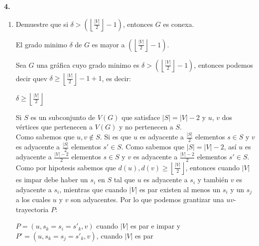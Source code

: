 \documentclass[12pt]{article}
\begin{document}
\vspace{1cm}
%
%
\textbf{4.}
\begin{enumerate}[label=\alph*)]

    \item Demuestre que si $\delta >  \left( \left\lfloor \frac{|V|}{2} \right\rfloor - 1 \right)$, entonces $G$ es conexa.
    \begin{tcolorbox}[title=\textbf{Hipotesis}, colback=red!15!white, colframe=black!]
        El grado minimo $\delta$ de $G$ es mayor a $\left( \left\lfloor \frac{|V|}{2} \right\rfloor - 1 \right)$.
    \end{tcolorbox}

        Sea $G$ una gráfica cuyo grado minimo es $\delta > \left( \left\lfloor \frac{|V|}{2} \right\rfloor - 1 \right)$, entonces
        podemos decir quev $\delta \geq  \left\lfloor \frac{|V|}{2} \right\rfloor - 1 + 1$, es decir:

        \begin{center}
        $\delta \geq  \left\lfloor \frac{|V|}{2} \right\rfloor$
        \end{center}

        Si $S$ es un subconjunto de $ V(G)$ que satisface $|S| = |V| - 2$ y $u$, $v$ dos vértices
        que pertenecen a $V(G)$ y no pertenecen a $S$.\\

        Como sabemos que $u, v \notin S$. Si es que $u$ es adyacente 
        a $\frac{|S|}{2}$ elementos $s \in S$ y $v$ es adyacente a $\frac{|S|}{2}$ elementos $s' \in S$.
        Como sabemos que $|S| = |V| - 2$, así $u$ es adyacente a $\frac{|V| - 2}{2}$ elementos $s \in S$ y $v$ es adyacente a
        $\frac{|V| - 2}{2}$ elementos $s' \in S$.\\

        Como por hipotesis sabemos que $d(u), d(v) \geq \left\lfloor \frac{|V|}{2} \right\rfloor$, entonces cuando
        $|V|$ es impar debe haber un $s_i$ en $S$ tal que $u$ es adyacente a $s_i$ y también $v$ es adyacente a $s_i$, 
        mientras que cuando $|V|$ es par existen al menos un $s_i$ y un $s_j$ a los cuales $u$ y $v$ son adyacentes.
        Por lo que podemos grantizar una $uv$- trayectoria $P$:
        
        \begin{center}
            $P = (u, s_k = s_i = s'_k, v)$ cuando $|V|$ es par e impar y\\

            $P' = (u, s_k = s_j = s'_k, v)$, cuando $|V|$ es par
        \end{center}


\end{enumerate}
\end{document}
